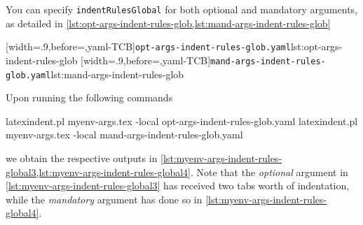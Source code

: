  \begin{example}
 You can specify \texttt{indentRulesGlobal} for both optional and mandatory arguments, as
 detailed in \cref{lst:opt-args-indent-rules-glob,lst:mand-args-indent-rules-glob}

 \begin{cmhtcbraster}
  [width=.9\linewidth,before=\centering,yaml-TCB]{\texttt{opt-args-indent-rules-glob.yaml}}{lst:opt-args-indent-rules-glob}
  [width=.9\linewidth,before=\centering,yaml-TCB]{\texttt{mand-args-indent-rules-glob.yaml}}{lst:mand-args-indent-rules-glob}
 \end{cmhtcbraster}

 Upon running the following commands 

 \begin{commandshell}
latexindent.pl myenv-args.tex -local opt-args-indent-rules-glob.yaml
latexindent.pl myenv-args.tex -local mand-args-indent-rules-glob.yaml
\end{commandshell}

 we obtain the respective outputs in
 \cref{lst:myenv-args-indent-rules-global3,lst:myenv-args-indent-rules-global4}. Note
 that the \emph{optional} argument in \cref{lst:myenv-args-indent-rules-global3} has
 received two tabs worth of indentation, while the \emph{mandatory} argument has done so
 in \cref{lst:myenv-args-indent-rules-global4}.

 \begin{widepage}
  \begin{minipage}{.55\textwidth}
  \end{minipage}
  \hfill
  \begin{minipage}{.55\textwidth}
  \end{minipage}
 \end{widepage}
 \end{example}
